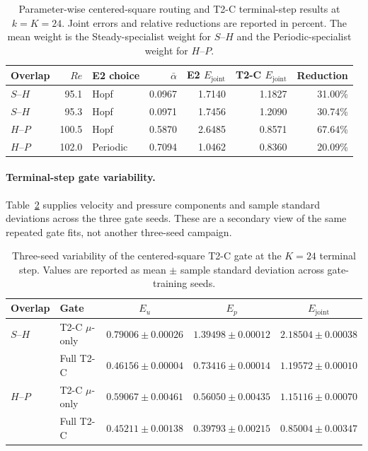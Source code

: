 \begin{table}[H]
\centering
\caption{
Parameter-wise centered-square routing and T2-C terminal-step results at $k=K=24$.
Joint errors and relative reductions are reported in percent.
The mean weight is the Steady-specialist weight for $S$--$H$
and the Periodic-specialist weight for $H$--$P$.
}
\label{tab:square_parameter}
\small
\setlength{\tabcolsep}{3.5pt}
\begin{tabular}{lrlrrrr}
\toprule
Overlap & $Re$ & E2 choice & $\bar\alpha$ & E2 $E_{\mathrm{joint}}$ & T2-C $E_{\mathrm{joint}}$ & Reduction \\
\midrule
$S$--$H$ & 95.1 & Hopf & 0.0967 & 1.7140 & 1.1827 & 31.00\% \\
$S$--$H$ & 95.3 & Hopf & 0.0971 & 1.7456 & 1.2090 & 30.74\% \\
$H$--$P$ & 100.5 & Hopf & 0.5870 & 2.6485 & 0.8571 & 67.64\% \\
$H$--$P$ & 102.0 & Periodic & 0.7094 & 1.0462 & 0.8360 & 20.09\% \\
\bottomrule
\end{tabular}
\end{table}

\paragraph{Terminal-step gate variability.}
Table~\ref{tab:t2c_seed_variability} supplies velocity and pressure
components and sample standard deviations across the three gate seeds.
These are a secondary view of the same repeated gate fits, not another
three-seed campaign.

\begin{table}[H]
\centering
\caption{
Three-seed variability of the centered-square T2-C gate at the $K=24$
terminal step. Values are reported as mean $\pm$ sample standard deviation across gate-training seeds.
}
\label{tab:t2c_seed_variability}
\small
\setlength{\tabcolsep}{4pt}
\begin{tabular}{@{}llccc@{}}
\toprule
Overlap & Gate & $E_u$ & $E_p$ & $E_{\mathrm{joint}}$ \\
\midrule
$S$--$H$ & T2-C $\mu$-only & $0.79006\pm0.00026$ & $1.39498\pm0.00012$ & $2.18504\pm0.00038$ \\
 & Full T2-C & $\mathbf{0.46156\pm0.00004}$ & $\mathbf{0.73416\pm0.00014}$ & $\mathbf{1.19572\pm0.00010}$ \\
\midrule
$H$--$P$ & T2-C $\mu$-only & $0.59067\pm0.00461$ & $0.56050\pm0.00435$ & $1.15116\pm0.00070$ \\
 & Full T2-C & $\mathbf{0.45211\pm0.00138}$ & $\mathbf{0.39793\pm0.00215}$ & $\mathbf{0.85004\pm0.00347}$ \\
\bottomrule
\end{tabular}
\end{table}

